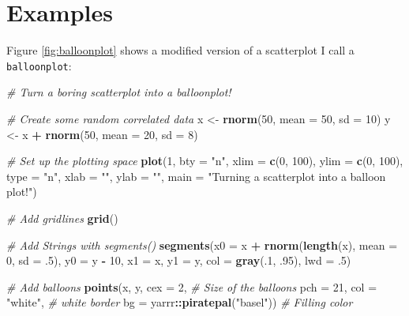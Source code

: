 \documentclass[]{book}
\newenvironment{Shaded}{\begin{snugshade}}{\end{snugshade}}
\newcommand{\KeywordTok}[1]{\textcolor[rgb]{0.13,0.29,0.53}{\textbf{#1}}}
\newcommand{\DataTypeTok}[1]{\textcolor[rgb]{0.13,0.29,0.53}{#1}}
\newcommand{\DecValTok}[1]{\textcolor[rgb]{0.00,0.00,0.81}{#1}}
\newcommand{\StringTok}[1]{\textcolor[rgb]{0.31,0.60,0.02}{#1}}
\newcommand{\CommentTok}[1]{\textcolor[rgb]{0.56,0.35,0.01}{\textit{#1}}}
\newcommand{\OperatorTok}[1]{\textcolor[rgb]{0.81,0.36,0.00}{\textbf{#1}}}
\newcommand{\NormalTok}[1]{#1}
\theoremstyle{definition}
\theoremstyle{definition}
\theoremstyle{remark}
\begin{document}
\section{Examples}\label{examples}

Figure \ref{fig:balloonplot} shows a modified version of a scatterplot I
call a \texttt{balloonplot}:

\begin{Shaded}
\begin{Highlighting}[]
\CommentTok{# Turn a boring scatterplot into a  balloonplot! }

\CommentTok{# Create some random correlated data}
\NormalTok{x <-}\StringTok{ }\KeywordTok{rnorm}\NormalTok{(}\DecValTok{50}\NormalTok{, }\DataTypeTok{mean =} \DecValTok{50}\NormalTok{, }\DataTypeTok{sd =} \DecValTok{10}\NormalTok{)}
\NormalTok{y <-}\StringTok{ }\NormalTok{x }\OperatorTok{+}\StringTok{ }\KeywordTok{rnorm}\NormalTok{(}\DecValTok{50}\NormalTok{, }\DataTypeTok{mean =} \DecValTok{20}\NormalTok{, }\DataTypeTok{sd =} \DecValTok{8}\NormalTok{)}

\CommentTok{# Set up the plotting space}
\KeywordTok{plot}\NormalTok{(}\DecValTok{1}\NormalTok{, }
     \DataTypeTok{bty =} \StringTok{"n"}\NormalTok{,}
     \DataTypeTok{xlim =} \KeywordTok{c}\NormalTok{(}\DecValTok{0}\NormalTok{, }\DecValTok{100}\NormalTok{),}
     \DataTypeTok{ylim =} \KeywordTok{c}\NormalTok{(}\DecValTok{0}\NormalTok{, }\DecValTok{100}\NormalTok{),}
     \DataTypeTok{type =} \StringTok{"n"}\NormalTok{, }\DataTypeTok{xlab =} \StringTok{""}\NormalTok{, }\DataTypeTok{ylab =} \StringTok{""}\NormalTok{, }
     \DataTypeTok{main =} \StringTok{"Turning a scatterplot into a balloon plot!"}\NormalTok{)}

\CommentTok{# Add gridlines}
\KeywordTok{grid}\NormalTok{()}

\CommentTok{# Add Strings with segments()}
\KeywordTok{segments}\NormalTok{(}\DataTypeTok{x0 =}\NormalTok{ x }\OperatorTok{+}\StringTok{ }\KeywordTok{rnorm}\NormalTok{(}\KeywordTok{length}\NormalTok{(x), }\DataTypeTok{mean =} \DecValTok{0}\NormalTok{, }\DataTypeTok{sd =}\NormalTok{ .}\DecValTok{5}\NormalTok{), }
         \DataTypeTok{y0 =}\NormalTok{ y }\OperatorTok{-}\StringTok{ }\DecValTok{10}\NormalTok{, }
         \DataTypeTok{x1 =}\NormalTok{ x, }
         \DataTypeTok{y1 =}\NormalTok{ y, }
         \DataTypeTok{col =} \KeywordTok{gray}\NormalTok{(.}\DecValTok{1}\NormalTok{, .}\DecValTok{95}\NormalTok{),}
         \DataTypeTok{lwd =}\NormalTok{ .}\DecValTok{5}\NormalTok{)}

\CommentTok{# Add balloons}
\KeywordTok{points}\NormalTok{(x, y, }
       \DataTypeTok{cex =} \DecValTok{2}\NormalTok{, }\CommentTok{# Size of the balloons}
       \DataTypeTok{pch =} \DecValTok{21}\NormalTok{, }
       \DataTypeTok{col =} \StringTok{"white"}\NormalTok{, }\CommentTok{# white border}
       \DataTypeTok{bg =}\NormalTok{ yarrr}\OperatorTok{::}\KeywordTok{piratepal}\NormalTok{(}\StringTok{"basel"}\NormalTok{))  }\CommentTok{# Filling color}
\end{Highlighting}
\end{Shaded}
\end{document}
